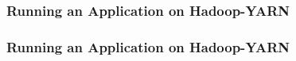 \begin{frame}[c]{ }
	\frametitle{Running an Application on Hadoop-YARN }
	\begin{figure}
		\centering
		
	\end{figure}
\end{frame}
\begin{frame}[c]{ }
	\frametitle{Running an Application on Hadoop-YARN }
	\begin{figure}
		\centering
		
	\end{figure}
\end{frame}
%		



